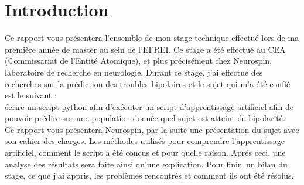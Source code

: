 \chapter*{Introduction}

Ce rapport vous présentera l'ensemble de mon stage technique effectué lors de ma première année de master au sein de l'EFREI. Ce stage a été effectué au CEA (Commissariat de l'Entité Atomique), et plus précisément chez Neurospin, laboratoire de recherche en neurologie. 
Durant ce stage, j'ai effectué des recherches sur la prédiction des troubles bipolaires et le sujet qui m'a été confié est le suivant : \\

écrire un script python afin d'exécuter un script d'apprentissage artificiel afin de pouvoir prédire sur une population donnée quel sujet est atteint de bipolarité. \\


Ce rapport vous présentera Neurospin, par la suite une présentation du sujet avec son cahier des charges. Les méthodes utilisés pour comprendre l'apprentissage artificiel, comment le script a été concus et pour quelle raison. Aprés ceci, une analyse des résultats sera faite ainsi qu'une explication. 
Pour finir, un bilan du stage, ce que j'ai appris, les problèmes rencontrés et comment ils ont été résolus. 

